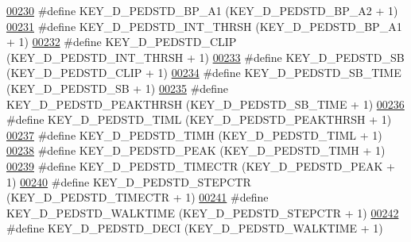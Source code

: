 \begin{DoxyCode}
\hypertarget{dmp_key_8h_source.tex_l00230}{}\hyperlink{dmp_key_8h_a917ece48b64c9e901bfeb3faf78f5daa}{00230} \textcolor{preprocessor}{#define KEY\_D\_PEDSTD\_BP\_A1          (KEY\_D\_PEDSTD\_BP\_A2 + 1)}
\hypertarget{dmp_key_8h_source.tex_l00231}{}\hyperlink{dmp_key_8h_ad04090bd27a4e24a4bfd0c00d04e4d02}{00231} \textcolor{preprocessor}{#define KEY\_D\_PEDSTD\_INT\_THRSH      (KEY\_D\_PEDSTD\_BP\_A1 + 1)}
\hypertarget{dmp_key_8h_source.tex_l00232}{}\hyperlink{dmp_key_8h_a17f86dc80dfdfe11ddc66c336e3060d9}{00232} \textcolor{preprocessor}{#define KEY\_D\_PEDSTD\_CLIP           (KEY\_D\_PEDSTD\_INT\_THRSH + 1)}
\hypertarget{dmp_key_8h_source.tex_l00233}{}\hyperlink{dmp_key_8h_a6336f3662c2a9ad16c1ed60d88d5fd52}{00233} \textcolor{preprocessor}{#define KEY\_D\_PEDSTD\_SB             (KEY\_D\_PEDSTD\_CLIP + 1)}
\hypertarget{dmp_key_8h_source.tex_l00234}{}\hyperlink{dmp_key_8h_a08f94b42741662987878db54eea9cc33}{00234} \textcolor{preprocessor}{#define KEY\_D\_PEDSTD\_SB\_TIME        (KEY\_D\_PEDSTD\_SB + 1)}
\hypertarget{dmp_key_8h_source.tex_l00235}{}\hyperlink{dmp_key_8h_a88041bbbd66473c7ca9f8f9283699e46}{00235} \textcolor{preprocessor}{#define KEY\_D\_PEDSTD\_PEAKTHRSH      (KEY\_D\_PEDSTD\_SB\_TIME + 1)}
\hypertarget{dmp_key_8h_source.tex_l00236}{}\hyperlink{dmp_key_8h_a77ea7861309656c13cbde8473814487f}{00236} \textcolor{preprocessor}{#define KEY\_D\_PEDSTD\_TIML           (KEY\_D\_PEDSTD\_PEAKTHRSH + 1)}
\hypertarget{dmp_key_8h_source.tex_l00237}{}\hyperlink{dmp_key_8h_afe293d2e9cac339ff82c6794d00f0fb9}{00237} \textcolor{preprocessor}{#define KEY\_D\_PEDSTD\_TIMH           (KEY\_D\_PEDSTD\_TIML + 1)}
\hypertarget{dmp_key_8h_source.tex_l00238}{}\hyperlink{dmp_key_8h_a8d6c043c17a97c1d803f9d53f83d00a1}{00238} \textcolor{preprocessor}{#define KEY\_D\_PEDSTD\_PEAK           (KEY\_D\_PEDSTD\_TIMH + 1)}
\hypertarget{dmp_key_8h_source.tex_l00239}{}\hyperlink{dmp_key_8h_a77841577cf104713d837791e727dc6c5}{00239} \textcolor{preprocessor}{#define KEY\_D\_PEDSTD\_TIMECTR        (KEY\_D\_PEDSTD\_PEAK + 1)}
\hypertarget{dmp_key_8h_source.tex_l00240}{}\hyperlink{dmp_key_8h_a9cc22745fd13b5719bf609a53659ecaf}{00240} \textcolor{preprocessor}{#define KEY\_D\_PEDSTD\_STEPCTR        (KEY\_D\_PEDSTD\_TIMECTR + 1)}
\hypertarget{dmp_key_8h_source.tex_l00241}{}\hyperlink{dmp_key_8h_a7955e0338ae5b73b276a47ce651db549}{00241} \textcolor{preprocessor}{#define KEY\_D\_PEDSTD\_WALKTIME       (KEY\_D\_PEDSTD\_STEPCTR + 1)}
\hypertarget{dmp_key_8h_source.tex_l00242}{}\hyperlink{dmp_key_8h_a63895bd35b3593d468fa509e71a3a2ac}{00242} \textcolor{preprocessor}{#define KEY\_D\_PEDSTD\_DECI           (KEY\_D\_PEDSTD\_WALKTIME + 1)}

\end{DoxyCode}
